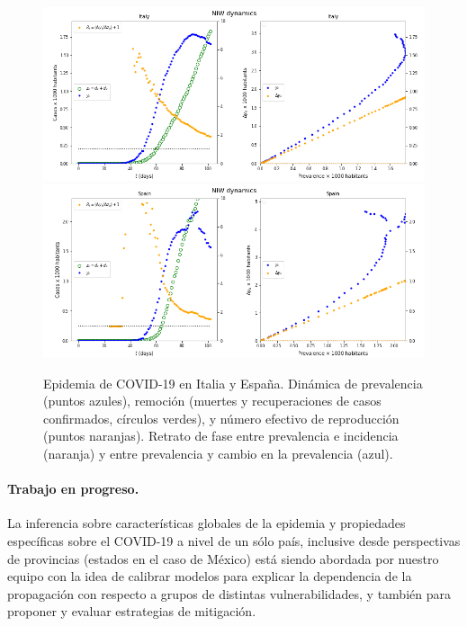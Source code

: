 \documentclass[8pt]{article}
\begin{document}
\begin{figure}[h] 
\centering
\includegraphics[width=\textwidth]{figures/dam_COVID19_JHU_dynamicsDataSIRPP_Italy}
\\
\includegraphics[width=\textwidth]{figures/dam_COVID19_JHU_dynamicsDataSIRPP_Spain}
\\
\caption{Epidemia de COVID-19 en Italia y España.
Dinámica de prevalencia (puntos azules), remoción (muertes y recuperaciones de casos confirmados, círculos verdes), y número efectivo de reproducción (puntos naranjas).  Retrato de fase entre prevalencia e incidencia (naranja) y entre prevalencia y cambio en la prevalencia (azul).}\label{fig:dataPPNIW_ItalySpain}
\end{figure}



\paragraph{Trabajo en progreso.}
La inferencia sobre características globales de la epidemia y propiedades específicas sobre el COVID-19 a nivel de un sólo país, inclusive desde perspectivas de provincias (estados en el caso de México)
 está siendo abordada por nuestro equipo con la idea de calibrar modelos para explicar la dependencia de la propagación con respecto a grupos de distintas vulnerabilidades, y también para proponer y evaluar estrategias de mitigación.





\newpage


\end{document}
